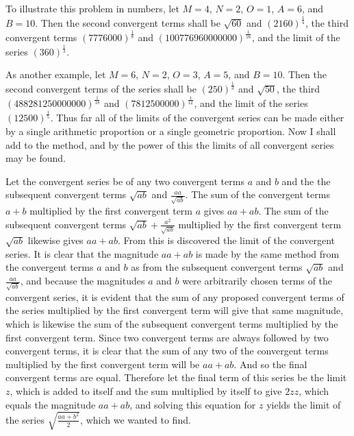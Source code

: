 \documentclass[11pt,letterpaper]{book}
\begin{document}
To illustrate this problem in numbers, let $M = 4$, $N = 2$, $O = 1$, $A = 6$,
and $B = 10$. Then the second convergent terms shall be $\sqrt{60}$ and
$\left(2160\right)^{\frac{1}{4}}$, the third convergent terms
$\left(7776000\right)^{\frac{1}{8}}$ and
$\left(100776960000000\right)^{\frac{1}{16}}$, and the limit of the series
$\left(360\right)^{\frac{1}{3}}$.

As another example, let $M = 6$, $N = 2$, $O = 3$, $A = 5$, and $B = 10$. Then
the second convergent terms of the series shall be
$\left(250\right)^{\frac{1}{3}}$ and $\sqrt{50}$, the third
$\left(488281250000000\right)^{\frac{1}{18}}$ and
$\left(7812500000\right)^{\frac{1}{12}}$, and the limit of the series
$\left(12500\right)^{\frac{1}{5}}$. Thus far all of the limits of the convergent
series can be made either by a single arithmetic proportion or a single
geometric proportion. Now I shall add to the method, and by the power of this
the limits of all convergent series may be found.

\newpage
{}

Let the convergent series be of any two convergent terms $a$ and $b$ and the the
subsequent convergent terms $\sqrt{ab}$ and $\frac{aa}{\sqrt{ab}}$. The sum
of the convergent terms $a+b$ multiplied by the first convergent term $a$ gives
$aa+ab$. The sum of the subsequent convergent terms
$\sqrt{ab}+\frac{a^{2}}{\sqrt{ab}}$ multiplied by the first convergent term
$\sqrt{ab}$ likewise gives $aa+ab$. From this is discovered the limit of
the convergent series. It is clear that the magnitude $aa+ab$ is made by
the same method from the convergent terms $a$ and $b$ as from the subsequent
convergent terms $\sqrt{ab}$ and $\frac{aa}{\sqrt{ab}}$, and because the
magnitudes $a$ and $b$ were arbitrarily chosen terms of the convergent series,
it is evident that the sum of any proposed convergent terms of the series
multiplied by the first convergent term will give that same magnitude, which is
likewise the sum of the subsequent convergent terms multiplied by the first
convergent term. Since two convergent terms are always followed by two
convergent terms, it is clear that the sum of any two of the convergent
terms multiplied by the first convergent term will be $aa+ab$. And so the
final convergent terms are equal. Therefore let the final term of this series be
the limit $z$, which is added to itself and the sum multiplied by itself to give
$2zz$, which equals the magnitude $aa+ab$, and solving this equation
for $z$ yields the limit of the series $\sqrt{\frac{aa+b^{2}}{2}}$, which we
wanted to find.
\end{document}
